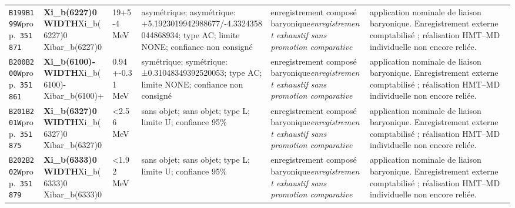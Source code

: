 \begin{landscape}
\begin{longtable}{L{1.85cm}L{4.45cm}L{2.35cm}L{4.05cm}L{3.35cm}L{7.15cm}}
\texttt{B199}\newline \texttt{B199W}\newline prop.\ \texttt{351871} & \textbf{Xi\_\allowbreak{}b(6227)0 WIDTH}\newline Xi\_\allowbreak{}b(6227)0 \textbar{}\allowbreak{} Xibar\_\allowbreak{}b(6227)0 & 19+5-4\,MeV & asymétrique; asymétrique: +5.1923019942988677/-4.3324358044868934; type AC; limite NONE; confiance non consigné & enregistrement composé baryonique\newline \emph{enregistrement exhaustif sans promotion comparative} & application nominale de liaison baryonique. Enregistrement externe comptabilisé ; réalisation HMT--MD individuelle non encore reliée. \\
\texttt{B200}\newline \texttt{B200W}\newline prop.\ \texttt{351861} & \textbf{Xi\_\allowbreak{}b(6100)- WIDTH}\newline Xi\_\allowbreak{}b(6100)- \textbar{}\allowbreak{} Xibar\_\allowbreak{}b(6100)+ & 0.94+-0.31\,MeV & symétrique; symétrique: ±0.31048349392520053; type AC; limite NONE; confiance non consigné & enregistrement composé baryonique\newline \emph{enregistrement exhaustif sans promotion comparative} & application nominale de liaison baryonique. Enregistrement externe comptabilisé ; réalisation HMT--MD individuelle non encore reliée. \\
\texttt{B201}\newline \texttt{B201W}\newline prop.\ \texttt{351875} & \textbf{Xi\_\allowbreak{}b(6327)0 WIDTH}\newline Xi\_\allowbreak{}b(6327)0 \textbar{}\allowbreak{} Xibar\_\allowbreak{}b(6327)0 & \textless{}2.56\,MeV & sans objet; sans objet; type L; limite U; confiance 95\% & enregistrement composé baryonique\newline \emph{enregistrement exhaustif sans promotion comparative} & application nominale de liaison baryonique. Enregistrement externe comptabilisé ; réalisation HMT--MD individuelle non encore reliée. \\
\texttt{B202}\newline \texttt{B202W}\newline prop.\ \texttt{351879} & \textbf{Xi\_\allowbreak{}b(6333)0 WIDTH}\newline Xi\_\allowbreak{}b(6333)0 \textbar{}\allowbreak{} Xibar\_\allowbreak{}b(6333)0 & \textless{}1.92\,MeV & sans objet; sans objet; type L; limite U; confiance 95\% & enregistrement composé baryonique\newline \emph{enregistrement exhaustif sans promotion comparative} & application nominale de liaison baryonique. Enregistrement externe comptabilisé ; réalisation HMT--MD individuelle non encore reliée. \\

\end{longtable}
\end{landscape}
